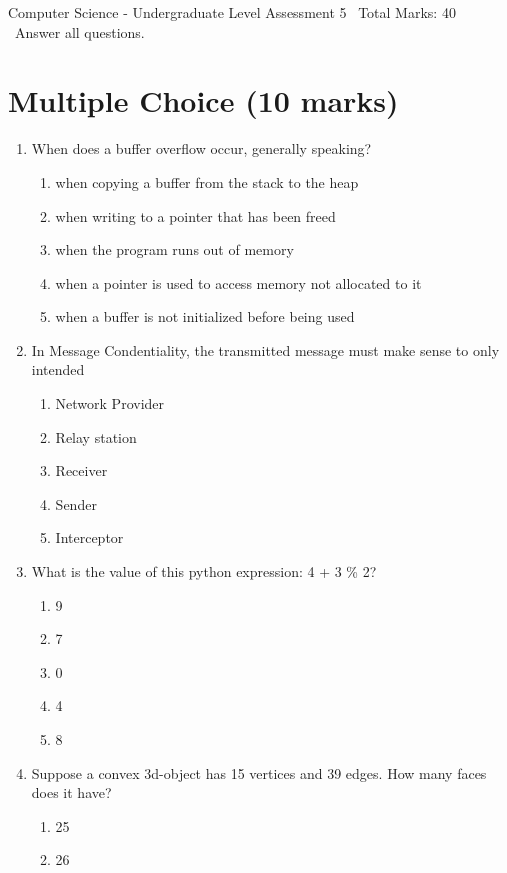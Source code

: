 \documentclass[12pt]{article}
\begin{document}
\begin{center}
Computer Science - Undergraduate Level Assessment 5 \
Total Marks: 40 \
Answer all questions.
\end{center}

\section*{Multiple Choice (10 marks)}
\begin{enumerate}[label=\arabic*.]
\item When does a buffer overflow occur, generally speaking?
\begin{enumerate}[label=(\alph*)]
    \item when copying a buffer from the stack to the heap
    \item when writing to a pointer that has been freed
    \item when the program runs out of memory
    \item when a pointer is used to access memory not allocated to it
    \item when a buffer is not initialized before being used
\end{enumerate}
\item In Message Condentiality, the transmitted message must make sense to only intended
\begin{enumerate}[label=(\alph*)]
    \item Network Provider
    \item Relay station
    \item Receiver
    \item Sender
    \item Interceptor
\end{enumerate}
\item What is the value of this python expression: 4 + 3 \% 2?
\begin{enumerate}[label=(\alph*)]
    \item 9
    \item 7
    \item 0
    \item 4
    \item 8
\end{enumerate}
\item Suppose a convex 3d-object has 15 vertices and 39 edges. How many faces does it have?
\begin{enumerate}[label=(\alph*)]
    \item 25
    \item 26

\end{enumerate}
\end{enumerate}
\end{document}

